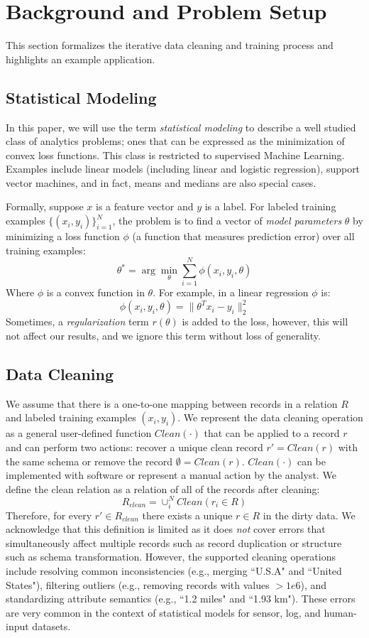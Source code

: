 \section{Background and Problem Setup}\label{background}
This section formalizes the iterative data cleaning and training process and highlights an example application.

\subsection{Statistical Modeling}
In this paper, we will use the term \emph{statistical modeling} to describe a well studied class of analytics problems; ones that can be expressed as the minimization of convex loss functions.
This class is restricted to supervised Machine Learning.
Examples include linear models (including linear and logistic regression), support vector machines, and in fact, means and medians are also special cases. 

Formally, suppose $x$ is a feature vector and $y$ is a label.
For labeled training examples $\{(x_{i},y_{i})\}_{i=1}^{N}$, the problem is to find a vector of \emph{model parameters} $\theta$ by minimizing a loss function $\phi$ (a function that measures prediction error) over all training examples:
\[
 \theta^{*}=\arg\min_{\theta}\sum_{i=1}^{N}\phi(x_{i},y_{i},\theta)
\]
Where $\phi$ is a convex function in $\theta$.
For example, in a linear regression $\phi$ is:
\[
\phi(x_{i},y_{i},\theta) = \|\theta^Tx_{i} - y_i \|_2^2
\]
Sometimes, a \emph{regularization} term $r(\theta)$ is added to the loss, however, this will not affect our results, and we ignore this term without loss of generality.

\subsection{Data Cleaning}
We assume that there is a one-to-one mapping between records in a relation $R$ and labeled training examples $(x_{i},y_{i})$.
We represent the data cleaning operation as a general user-defined function $Clean(\cdot)$ that can be applied to a record $r$ and can perform two actions: recover a unique clean record $r' = Clean(r)$ with the same schema or remove the record $\emptyset = Clean(r)$.
$Clean(\cdot)$ can be implemented with software or represent a manual action by the analyst.
We define the clean relation as a relation of all of the records after cleaning:
\[R_{clean} = \cup_i^N Clean(r_i \in R)\]
Therefore, for every $r' \in R_{clean}$ there exists a unique $r \in R$ in the dirty data.
We acknowledge that this definition is limited as it does \emph{not} cover errors that simultaneously affect multiple records such as record duplication or structure such as schema transformation.
However, the supported cleaning operations include resolving common inconsistencies (e.g., merging ``U.S.A" and ``United States"), filtering outliers (e.g., removing records with values $>1e6$), and standardizing attribute semantics (e.g., ``1.2 miles" and ``1.93 km").
These errors are very common in the context of statistical models for sensor, log, and human-input datasets. 

